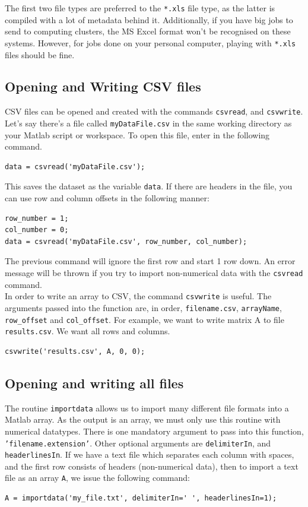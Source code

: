 \documentclass[12pt]{article}
\begin{document}
The first two file types are preferred to the \texttt{*.xls} file type, as the latter is compiled with a lot of metadata behind it. Additionally, if you have big jobs to send to computing clusters, the MS Excel format won't be recognised on these systems. However, for jobs done on your personal computer, playing with \texttt{*.xls} files should be fine. 

\subsection{Opening and Writing CSV files}
CSV files can be opened and created with the commands \texttt{csvread}, and \texttt{csvwrite}.
Let's say there's a file called \texttt{myDataFile.csv} in the same working directory as your Matlab script or workspace. To open this file, enter in the following command. 
\begin{lstlisting}
data = csvread('myDataFile.csv');

\end{lstlisting}
This saves the dataset as the variable \texttt{data}. If there are headers in the file, you can use row and column offsets in the following manner:
\begin{lstlisting}
row_number = 1;
col_number = 0;
data = csvread('myDataFile.csv', row_number, col_number);
\end{lstlisting}
The previous command will ignore the first row and start 1 row down. An error message will be thrown if you try to import non-numerical data with the \texttt{csvread} command.\\

In order to write an array to CSV, the command \texttt{csvwrite} is useful. The arguments passed into the function are, in order, \texttt{filename.csv}, \texttt{arrayName}, \texttt{row\_offset} and \texttt{col\_offset}. For example, we want to write matrix A to file \texttt{results.csv}. We want all rows and columns.\\
\begin{lstlisting}
csvwrite('results.csv', A, 0, 0);
\end{lstlisting}

\subsection{Opening and writing all files}
The routine \texttt{importdata} allows us to import many different file formats into a Matlab array. As the output is an array, we must only use this routine with numerical datatypes. There is one mandatory argument to pass into this function, \texttt{'filename.extension'}. Other optional arguments are \texttt{delimiterIn}, and \texttt{headerlinesIn}. If we have a text file which separates each column with spaces, and the first row consists of headers (non-numerical data), then to import a text file as an array \texttt{A}, we issue the following command:
\begin{lstlisting}
A = importdata('my_file.txt', delimiterIn=' ', headerlinesIn=1);
\end{lstlisting}
\end{document}
